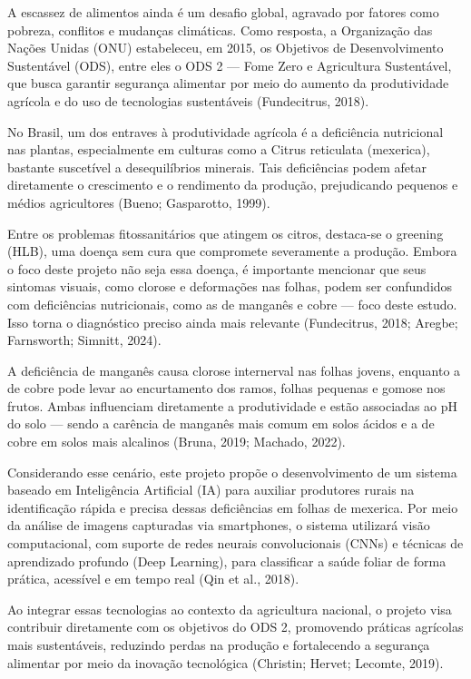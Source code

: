 A escassez de alimentos ainda é um desafio global, agravado por fatores como pobreza, conflitos e mudanças climáticas. Como resposta, a Organização das Nações Unidas (ONU) estabeleceu, em 2015, os Objetivos de Desenvolvimento Sustentável (ODS), entre eles o ODS 2 — Fome Zero e Agricultura Sustentável, que busca garantir segurança alimentar por meio do aumento da produtividade agrícola e do uso de tecnologias sustentáveis (Fundecitrus, 2018).

No Brasil, um dos entraves à produtividade agrícola é a deficiência nutricional nas plantas, especialmente em culturas como a Citrus reticulata (mexerica), bastante suscetível a desequilíbrios minerais. Tais deficiências podem afetar diretamente o crescimento e o rendimento da produção, prejudicando pequenos e médios agricultores (Bueno; Gasparotto, 1999).

Entre os problemas fitossanitários que atingem os citros, destaca-se o greening (HLB), uma doença sem cura que compromete severamente a produção. Embora o foco deste projeto não seja essa doença, é importante mencionar que seus sintomas visuais, como clorose e deformações nas folhas, podem ser confundidos com deficiências nutricionais, como as de manganês e cobre — foco deste estudo. Isso torna o diagnóstico preciso ainda mais relevante (Fundecitrus, 2018; Aregbe; Farnsworth; Simnitt, 2024).

A deficiência de manganês causa clorose internerval nas folhas jovens, enquanto a de cobre pode levar ao encurtamento dos ramos, folhas pequenas e gomose nos frutos. Ambas influenciam diretamente a produtividade e estão associadas ao pH do solo — sendo a carência de manganês mais comum em solos ácidos e a de cobre em solos mais alcalinos (Bruna, 2019; Machado, 2022).

Considerando esse cenário, este projeto propõe o desenvolvimento de um sistema baseado em Inteligência Artificial (IA) para auxiliar produtores rurais na identificação rápida e precisa dessas deficiências em folhas de mexerica. Por meio da análise de imagens capturadas via smartphones, o sistema utilizará visão computacional, com suporte de redes neurais convolucionais (CNNs) e técnicas de aprendizado profundo (Deep Learning), para classificar a saúde foliar de forma prática, acessível e em tempo real (Qin et al., 2018).

Ao integrar essas tecnologias ao contexto da agricultura nacional, o projeto visa contribuir diretamente com os objetivos do ODS 2, promovendo práticas agrícolas mais sustentáveis, reduzindo perdas na produção e fortalecendo a segurança alimentar por meio da inovação tecnológica (Christin; Hervet; Lecomte, 2019).